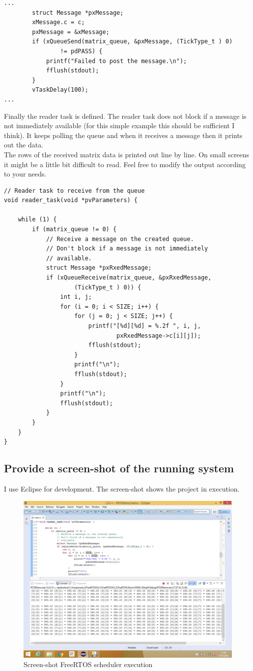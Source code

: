 \documentclass[a4paper]{article}
\begin{document}
\begin{lstlisting}[label=Sending a message,caption=Sending a message to the message queue]
...
		struct Message *pxMessage;
		xMessage.c = c;
		pxMessage = &xMessage;
		if (xQueueSend(matrix_queue, &pxMessage, (TickType_t ) 0)
        		!= pdPASS) {
			printf("Failed to post the message.\n");
			fflush(stdout);
		}
		vTaskDelay(100);
...
\end{lstlisting}

Finally the reader task is defined. The reader task does not block if a message is not immediately available (for this simple example this should be sufficient I think). It keeps polling the queue and when it receives a message then it prints out the data. \\
The rows of the received matrix data is printed out line by line. On small screens it might be a little bit difficult to read. Feel free to modify the output according to your needs.\\

\begin{lstlisting}[label=Reader Task - Receiving a message,caption=Receiving a message from the message queue]
// Reader task to receive from the queue
void reader_task(void *pvParameters) {

	while (1) {
		if (matrix_queue != 0) {
			// Receive a message on the created queue.
			// Don't block if a message is not immediately
			// available.
			struct Message *pxRxedMessage;
			if (xQueueReceive(matrix_queue, &pxRxedMessage,
            		(TickType_t ) 0)) {
				int i, j;
				for (i = 0; i < SIZE; i++) {
					for (j = 0; j < SIZE; j++) {
						printf("[%d][%d] = %.2f ", i, j,
								pxRxedMessage->c[i][j]);
						fflush(stdout);
					}
					printf("\n");
					fflush(stdout);
				}
				printf("\n");
				fflush(stdout);
			}
		}
	}
}
\end{lstlisting}

\newpage

\subsection{Provide a screen-shot of the running system}

I use Eclipse for development. The screen-shot shows the project in execution.\\

\begin{figure}[!ht]
\begin{center}
\includegraphics[width=\textwidth]{Assignment_5.png}
\caption{Screen-shot FreeRTOS scheduler execution}
\end{center}
\end{figure}
\end{document}
